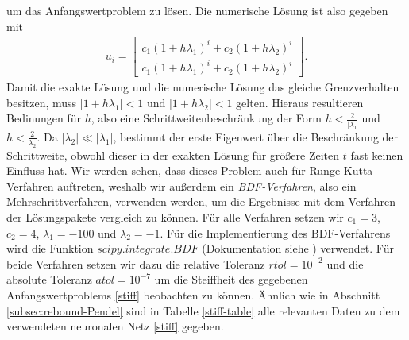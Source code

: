 um das Anfangswertproblem zu lösen. Die numerische Lösung ist also gegeben mit
\begin{align*}
       u_{i}=
       \begin{bmatrix}
              c_1 (1+h\lambda_1)^{i} + c_2 (1+h\lambda_2)^{i}\\
              c_1 (1+h\lambda_1)^{i} + c_2 (1+h\lambda_2)^{i}
       \end{bmatrix}.
\end{align*}
Damit die exakte Lösung und die numerische Lösung das gleiche Grenzverhalten besitzen, muss $|1 + h\lambda_1|<1$ und
$|1 + h\lambda_2|<1$ gelten. Hieraus resultieren Bedinungen für $h$, also eine Schrittweitenbeschränkung der Form
$h<\frac{2}{|\lambda_1}$ und $h<\frac{2}{\lambda_2}$. Da $|\lambda_2| \ll |\lambda_1|$, bestimmt der erste Eigenwert
über die Beschränkung der Schrittweite, obwohl dieser in der exakten Lösung für größere Zeiten $t$ fast keinen Einfluss
hat. Wir werden sehen, dass dieses Problem auch für Runge-Kutta-Verfahren auftreten, weshalb wir außerdem ein
\textit{BDF-Verfahren}, also ein Mehrschrittverfahren, verwenden werden, um die Ergebnisse mit dem Verfahren der
Lösungspakete vergleich zu können. Für alle Verfahren setzen wir $c_1=3$, $c_2=4$, $\lambda_1 = -100$ und $\lambda_2=-1$.
Für die Implementierung des BDF-Verfahrens wird die Funktion $scipy.integrate.BDF$ (Dokumentation siehe
\cite{ScipyIntegrateBDF}) verwendet. Für beide Verfahren setzen wir dazu die relative Toleranz $rtol=10^{-2}$ und die
absolute Toleranz $atol=10^{-7}$ um die Steiffheit des gegebenen Anfangswertproblems \eqref{stiff} beobachten zu können.
Ähnlich wie in Abschnitt \ref{subsec:rebound-Pendel} sind in Tabelle \ref{stiff-table} alle relevanten Daten zu dem
verwendeten neuronalen Netz \eqref{stiff} gegeben.
